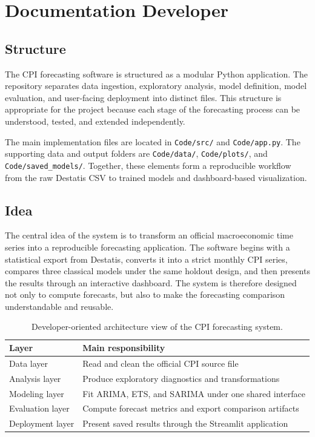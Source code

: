 %
%
%

\chapter{Documentation Developer}
\label{ch:doc-dev}

\section{Structure}

The CPI forecasting software is structured as a modular Python application. The repository separates data ingestion, exploratory analysis, model definition, model evaluation, and user-facing deployment into distinct files. This structure is appropriate for the project because each stage of the forecasting process can be understood, tested, and extended independently.

The main implementation files are located in \texttt{Code/src/} and \texttt{Code/app.py}. The supporting data and output folders are \texttt{Code/data/}, \texttt{Code/plots/}, and \texttt{Code/saved\_models/}. Together, these elements form a reproducible workflow from the raw Destatis CSV to trained models and dashboard-based visualization.

\section{Idea}

The central idea of the system is to transform an official macroeconomic time series into a reproducible forecasting application. The software begins with a statistical export from Destatis, converts it into a strict monthly CPI series, compares three classical models under the same holdout design, and then presents the results through an interactive dashboard. The system is therefore designed not only to compute forecasts, but also to make the forecasting comparison understandable and reusable.

\begin{table}[htbp]
	\centering
	\caption{Developer-oriented architecture view of the CPI forecasting system.}
	\label{tab:developer-architecture-view}
	\begin{tabular}{p{4cm}p{8.5cm}}
		\hline
		Layer & Main responsibility \\
		\hline
		Data layer & Read and clean the official CPI source file \\
		Analysis layer & Produce exploratory diagnostics and transformations \\
		Modeling layer & Fit ARIMA, ETS, and SARIMA under one shared interface \\
		Evaluation layer & Compute forecast metrics and export comparison artifacts \\
		Deployment layer & Present saved results through the Streamlit application \\
		\hline
	\end{tabular}
\end{table}

